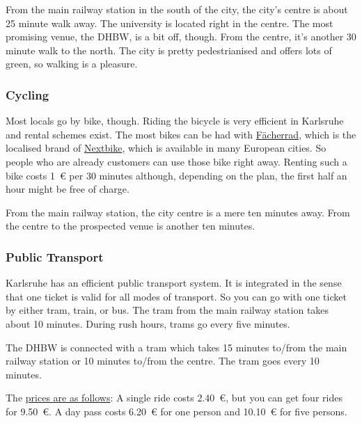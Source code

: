 From the main railway station in the south of the city,
the city's centre is about 25 minute walk away.
The university is located right in the centre.
The most promising venue, the DHBW, is a bit off, though.
From the centre, it's another 30 minute walk to the north.
The city is pretty pedestrianised and offers lots of green,
so walking is a pleasure.

\subsubsection{Cycling}
Most locals go by bike, though.
Riding the bicycle is very efficient in Karlsruhe and
rental schemes exist.
The most bikes can be had with \href{http://www.faecherrad.de/de/karlsruhe/preise/}{Fächerrad},
which is the localised brand of \href{http://www.nextbike.de/de/news/das-karlsruher-leihfahrrad-hei%C3%9Ft-f%C3%A4cherrad/}{Nextbike},
which is available in many European cities.
So people who are already customers can use those bike right away.
Renting such a bike costs \SI{1}{\euro} per 30 minutes although,
depending on the plan, the first half an hour might be free of charge.

From the main railway station, the city centre is a mere ten minutes 
away.
From the centre to the prospected venue is another ten minutes.



\subsubsection{Public Transport}

Karlsruhe has an efficient public transport system.
It is integrated in the sense that one ticket is valid
for all modes of transport.
So you can go with one ticket by either tram, train, or bus.
The tram from the main railway station takes about 10 minutes.
During rush hours, trams go every five minutes.

The DHBW is connected with a tram which takes 15 minutes to/from the 
main railway station or 10 minutes to/from the centre.
The tram goes every 10 minutes.

The 
\href{http://www.kvv.de/fahrkarten/fahrkarten-preise/einzelfahrkarten.html}%
{prices are as follows}:
A single ride costs \SI{2.40}{\euro}, but you can get four rides for \SI{9.50}{\euro}.
A day pass costs \SI{6.20}{\euro} for one person and \SI{10.10}{\euro} for five 
persons.

\newpage
